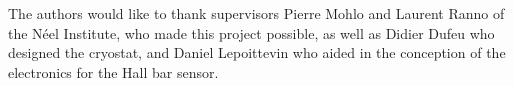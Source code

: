 \documentclass[journal,a4paper]{IEEEtran}
\begin{document}
The authors would like to thank supervisors Pierre Mohlo and Laurent Ranno of the Néel Institute, who made this project possible, as well as Didier Dufeu who designed the cryostat, and Daniel Lepoittevin who aided in the conception of the electronics for the Hall bar sensor.


\ifCLASSOPTIONcaptionsoff
  \newpage
\fi










%




% 
\end{document}

